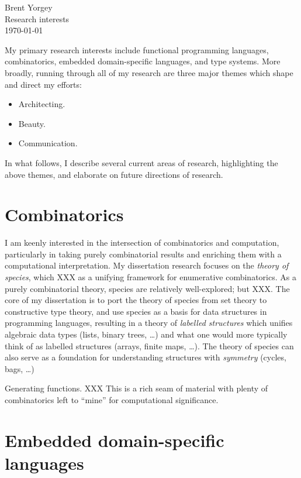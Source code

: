 \documentclass{article}
\begin{document}
\noindent Brent Yorgey \\
Research interests \\
\today
\bigskip

My primary research interests include functional programming
languages, combinatorics, embedded domain-specific languages, and type
systems.  More broadly, running through all of my research are three
major themes which shape and direct my efforts:

\begin{itemize}
\item Architecting.
\item Beauty.
\item Communication.
\end{itemize}

In what follows, I describe several current areas of research,
highlighting the above themes, and elaborate on future directions of
research.

\section*{Combinatorics}
\label{sec:combinatorics}

I am keenly interested in the intersection of combinatorics and
computation, particularly in taking purely combinatorial results and
enriching them with a computational interpretation.  My dissertation
research focuses on the \emph{theory of species}, which XXX as a
unifying framework for enumerative combinatorics.  As a purely
combinatorial theory, species are relatively well-explored; but XXX.
The core of my dissertation is to port the theory of species from set
theory to constructive type theory, and use species as a basis for
data structures in programming languages, resulting in a theory of
\emph{labelled structures} which unifies algebraic data types (lists,
binary trees, \dots) and what one would more typically think of as
labelled structures (arrays, finite maps, \dots).  The theory of
species can also serve as a foundation for understanding structures
with \emph{symmetry} (cycles, bags, \dots)

Generating functions. XXX This is a rich seam of material with plenty
of combinatorics left to ``mine'' for computational significance.

\section{Embedded domain-specific languages}
\label{sec:edsls}
\end{document}
